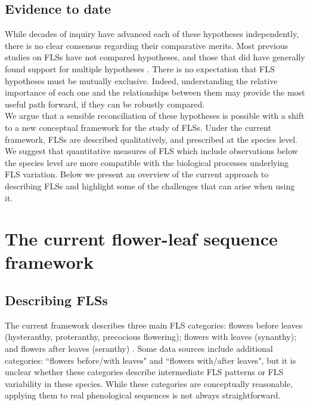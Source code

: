 \documentclass[11pt]{article}
\begin{document}
\subsection*{Evidence to date}
\noindent While decades of inquiry have advanced each of these hypotheses independently, there is no clear consensus regarding their comparative merits. Most previous studies on FLSs have not compared hypotheses, and those that did have generally found support for multiple hypotheses \citep[see][]{Bolmgren2003,Gougherty2018}. There is no expectation that FLS hypotheses must be mutually exclusive. Indeed, understanding the relative importance of each one and the relationships between them may provide the most useful path forward, if they can be robustly compared.\\

\noindent We argue that a sensible reconciliation of these hypotheses is possible with a shift to a new conceptual framework for the study of FLSs. Under the current framework, FLSs are described qualitatively, and prescribed at the species level. We suggest that quantitative measures of FLS which include observations below the species level are more compatible with the biological processes underlying FLS variation. Below we present an overview of the current approach to describing FLSs and highlight some of the challenges that can arise when using it.\\

\section*{The current flower-leaf sequence framework}
\subsection*{Describing FLSs}
\noindent  The current framework describes three main FLS categories: flowers before leaves (hysteranthy, proteranthy, precocious flowering); flowers with leaves (synanthy); and flowers after leaves (seranthy) \citep{Lamont2011, Heinig1899}. Some data sources \citep[e.g.][]{Burns1990,Barnes2004} include additional categories: ``flowers before/with leaves" and ``flowers with/after leaves", but it is unclear whether these categories describe intermediate FLS patterns or FLS variability in these species. While these categories are conceptually reasonable, applying them to real phenological sequences is not always straightforward.\\
\end{document}
